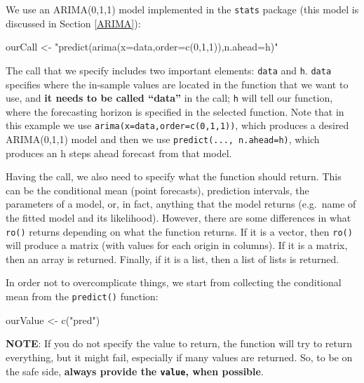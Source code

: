 \documentclass[
]{book}
\newenvironment{Shaded}{\begin{snugshade}}{\end{snugshade}}
\newcommand{\FunctionTok}[1]{\textcolor[rgb]{0.00,0.00,0.00}{#1}}
\newcommand{\NormalTok}[1]{#1}
\newcommand{\OtherTok}[1]{\textcolor[rgb]{0.56,0.35,0.01}{#1}}
\newcommand{\StringTok}[1]{\textcolor[rgb]{0.31,0.60,0.02}{#1}}
\theoremstyle{definition}
\theoremstyle{definition}
\theoremstyle{definition}
\theoremstyle{definition}
\theoremstyle{remark}
\begin{document}
We use an ARIMA(0,1,1) model implemented in the \texttt{stats} package (this model is discussed in Section \ref{ARIMA}):

\begin{Shaded}
\begin{Highlighting}[]
\NormalTok{ourCall }\OtherTok{\textless{}{-}} \StringTok{"predict(arima(x=data,order=c(0,1,1)),n.ahead=h)"}
\end{Highlighting}
\end{Shaded}

The call that we specify includes two important elements: \texttt{data} and \texttt{h}. \texttt{data} specifies where the in-sample values are located in the function that we want to use, and \textbf{it needs to be called ``data''} in the call; \texttt{h} will tell our function, where the forecasting horizon is specified in the selected function. Note that in this example we use \texttt{arima(x=data,order=c(0,1,1))}, which produces a desired ARIMA(0,1,1) model and then we use \texttt{predict(...,\ n.ahead=h)}, which produces an h steps ahead forecast from that model.

Having the call, we also need to specify what the function should return. This can be the conditional mean (point forecasts), prediction intervals, the parameters of a model, or, in fact, anything that the model returns (e.g.~name of the fitted model and its likelihood). However, there are some differences in what \texttt{ro()} returns depending on what the function returns. If it is a vector, then \texttt{ro()} will produce a matrix (with values for each origin in columns). If it is a matrix, then an array is returned. Finally, if it is a list, then a list of lists is returned.

In order not to overcomplicate things, we start from collecting the conditional mean from the \texttt{predict()} function:

\begin{Shaded}
\begin{Highlighting}[]
\NormalTok{ourValue }\OtherTok{\textless{}{-}} \FunctionTok{c}\NormalTok{(}\StringTok{"pred"}\NormalTok{)}
\end{Highlighting}
\end{Shaded}

\textbf{NOTE}: If you do not specify the value to return, the function will try to return everything, but it might fail, especially if many values are returned. So, to be on the safe side, \textbf{always provide the \texttt{value}, when possible}.
\end{document}
